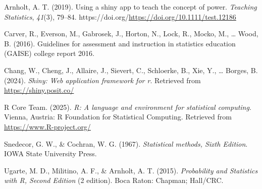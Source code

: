 \documentclass[
]{article}
\newlength{\cslhangindent}
\newlength{\cslentryspacingunit} %
\newenvironment{CSLReferences}[2] %
 {%
  \setlength{\parindent}{0pt}
  \ifodd #1
  \let\oldpar\par
  \def\par{\hangindent=\cslhangindent\oldpar}
  \fi
  \setlength{\parskip}{#2\cslentryspacingunit}
 }%
 {}
\begin{document}
\hypertarget{refs}{}
\begin{CSLReferences}{1}{0}
\leavevmode{}%
Arnholt, A. T. (2019). Using a shiny app to teach the concept of power. \emph{Teaching Statistics}, \emph{41}(3), 79--84. https://doi.org/\url{https://doi.org/10.1111/test.12186}

\leavevmode{}%
Carver, R., Everson, M., Gabrosek, J., Horton, N., Lock, R., Mocko, M., \ldots{} Wood, B. (2016). Guidelines for assessment and instruction in statistics education (GAISE) college report 2016.

\leavevmode{}%
Chang, W., Cheng, J., Allaire, J., Sievert, C., Schloerke, B., Xie, Y., \ldots{} Borges, B. (2024). \emph{Shiny: Web application framework for r}. Retrieved from \url{https://shiny.posit.co/}

\leavevmode{}%
R Core Team. (2025). \emph{R: A language and environment for statistical computing}. Vienna, Austria: R Foundation for Statistical Computing. Retrieved from \url{https://www.R-project.org/}

\leavevmode{}%
Snedecor, G. W., \& Cochran, W. G. (1967). \emph{Statistical methods, {Sixth} {Edition}}. IOWA State University Press.

\leavevmode{}%
Ugarte, M. D., Militino, A. F., \& Arnholt, A. T. (2015). \emph{Probability and {Statistics} with {R}, {Second} {Edition}} (2 edition). Boca Raton: Chapman; Hall/CRC.

\end{CSLReferences}
\end{document}

